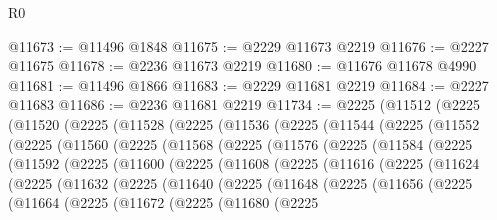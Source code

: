 \begin{lexlean}{R0}
\begin{coremodule}
@11673 := @11496 @1848
@11675 := @2229 @11673 @2219
@11676 := @2227 @11675
@11678 := @2236 @11673 @2219
@11680 := @11676 @11678 @4990
@11681 := @11496 @1866
@11683 := @2229 @11681 @2219
@11684 := @2227 @11683
@11686 := @2236 @11681 @2219
@11734 := @2225
    (@11512
      (@2225
        (@11520
          (@2225
            (@11528
              (@2225
                (@11536
                  (@2225
                    (@11544
                      (@2225
                        (@11552
                          (@2225
                            (@11560
                              (@2225
                                (@11568
                                  (@2225
                                    (@11576
                                      (@2225
                                        (@11584
                                          (@2225
                                            (@11592
                                              (@2225
                                                (@11600
                                                  (@2225
                                                    (@11608
                                                      (@2225
                                                        (@11616
                                                          (@2225
                                                            (@11624
                                                              (@2225
                                                                (@11632
                                                                  (@2225
                                                                    (@11640
                                                                      (@2225
                                                                        (@11648
                                                                          (@2225
                                                                            (@11656
                                                                              (@2225
                                                                                (@11664
                                                                                  (@2225
                                                                                    (@11672
                                                                                      (@2225
                                                                                        (@11680
                                                                                          (@2225

\end{coremodule}
\end{lexlean}
